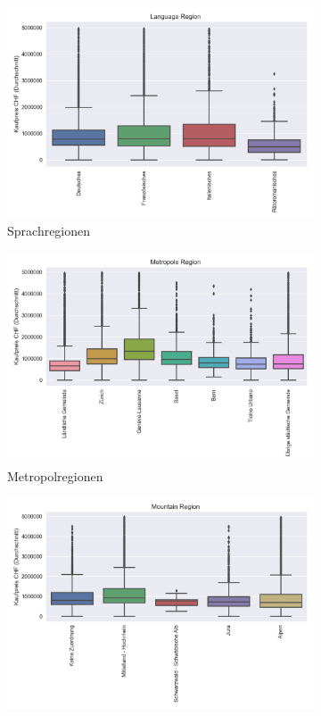 \begin{figure}[h]
\begin{subfigure}{.5\textwidth}
  \includegraphics[width=\linewidth]{images/anhang/analysis/boxplot_language_region_id.png}
  \caption{Sprachregionen}
\end{subfigure}
\begin{subfigure}{.5\textwidth}
  \centering
  \includegraphics[width=\linewidth]{images/anhang/analysis/boxplot_metropole_region_id.png}
  \caption{Metropolregionen}
\end{subfigure}
\begin{subfigure}{.5\textwidth}
  \centering
  \includegraphics[width=\linewidth]{images/anhang/analysis/boxplot_mountain_region_id.png}

\end{subfigure}
\end{figure}
